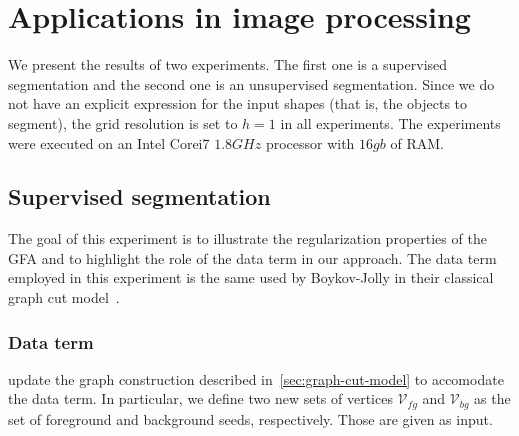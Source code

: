 \documentclass[review]{siamart220329}
\begin{document}
\section{Applications in image processing}

 We present the results of two experiments. The first one is a supervised segmentation and the second one is an unsupervised segmentation. Since we do not have an explicit expression for the input shapes (that is, the objects to segment), the grid resolution is set to $h=1$ in all experiments. The experiments were executed on an Intel Corei7 $1.8GHz$ processor with $16gb$ of RAM.


\subsection{Supervised segmentation}

The goal of this experiment is to illustrate the regularization properties of the GFA and to highlight the role of the data term in our approach. The data term employed in this experiment is the same used by Boykov-Jolly in their classical graph cut model~\cite{boykov01graphcut}. 

\subsubsection{Data term}
 update the graph construction described in~\cref{sec:graph-cut-model} to accomodate the data term. In particular, we define two new sets of vertices $\mathcal{V}_{fg}$ and $\mathcal{V}_{bg}$ as the set of foreground and background seeds, respectively. Those are given as input.
\end{document}
